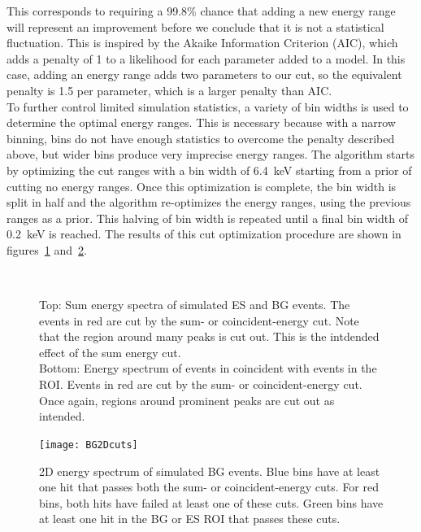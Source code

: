 \documentclass[/main.tex]{subfiles}
\begin{document}
This corresponds to requiring a 99.8\% chance that adding a new energy range will represent an improvement before we conclude that it is not a statistical fluctuation.
This is inspired by the Akaike Information Criterion (AIC), which adds a penalty of 1 to a likelihood for each parameter added to a model.
In this case, adding an energy range adds two parameters to our cut, so the equivalent penalty is 1.5 per parameter, which is a larger penalty than AIC.
\\
To further control limited simulation statistics, a variety of bin widths is used to determine the optimal energy ranges.
This is necessary because with a narrow binning, bins do not have enough statistics to overcome the penalty described above, but wider bins produce very imprecise energy ranges.
The algorithm starts by optimizing the cut ranges with a bin width of 6.4~keV starting from a prior of cutting no energy ranges.
Once this optimization is complete, the bin width is split in half and the algorithm re-optimizes the energy ranges, using the previous ranges as a prior.
This halving of bin width is repeated until a final bin width of 0.2~keV is reached.
The results of this cut optimization procedure are shown in figures~\ref{fig:sumandcoinEcuts} and~\ref{fig:2Dcuts}.
\\
\begin{figure}[!h]
  \centering
  \\
  \caption[Sum and coincident simulated energy spectra with cuts]{\label{fig:sumandcoinEcuts}
    Top: Sum energy spectra of simulated ES and BG events. The events in red are cut by the sum- or coincident-energy cut. Note that the region around many peaks is cut out. This is the intdended effect of the sum energy cut.\\
    Bottom: Energy spectrum of events in coincident with events in the ROI. Events in red are cut by the sum- or coincident-energy cut. Once again, regions around prominent peaks are cut out as intended.
  }
\end{figure}

\begin{figure}[h]
  \centering
  \texttt{[image: BG2Dcuts]}
  \caption[2D energy spectrum of simulated BG events]{\label{fig:2Dcuts}
    2D energy spectrum of simulated BG events. Blue bins have at least one hit that passes both the sum- or coincident-energy cuts. For red bins, both hits have failed at least one of these cuts. Green bins have at least one hit in the BG or ES ROI that passes these cuts.
    }
\end{figure}
\end{document}
